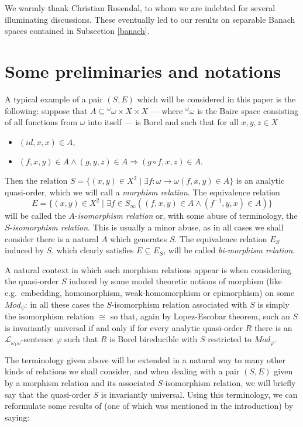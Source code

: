 \documentclass{amsart}
\theoremstyle{definition}
\theoremstyle{remark}
\begin{document}
We warmly thank Christian Rosendal, to whom we are indebted for several illuminating discussions.
These eventually led to our results on separable Banach spaces contained in Subsection \ref{banach}.

\section{Some preliminaries and notations}

A typical example of a pair $(S,E)$ which will be considered in this
paper is the following: suppose that $A
\subseteq {}^\omega \omega \times X \times X$ --- where ${}^\omega
\omega$ is the Baire space consisting of all functions from $\omega$
into itself --- is Borel and such that for all $x,y,z\in X$
\begin{itemize}
\item $(id, x,x) \in A$,
\item $(f,x,y) \in A
\wedge (g,y,z) \in A {\Rightarrow} (g \circ f, x,z) \in A.$
\end{itemize}
 Then the relation $S = \{ (x,y) \in X^2 \mid \exists f \colon \omega
 \to \omega (f,x,y) \in A \}$ is an analytic
quasi-order, which we will call a \emph{morphism relation}.
The equivalence relation
\[ E = \{ (x,y) \in X^2 \mid
\exists f \in S_\infty ((f,x,y) \in A \wedge (f^{-1},y,x) \in A)\} \]
will be called the $A$-\emph{isomorphism relation} or, with some abuse
of terminology, the $S$-\emph{isomorphism relation}.
This is usually a minor abuse, as in all cases we shall consider there
is a natural $A$ which generates $S$.
The equivalence
relation $E_S$ induced by $S$, which
clearly satisfies $E \subseteq E_S$, will be
called \emph{bi-morphism relation}.

A natural context in which such
morphism relations appear is when considering the quasi-order $S$
induced by some
model theoretic
notions of morphism (like e.g.\ embedding, homomorphism,
weak-homomorphism or epimorphism) on
some $Mod_{\psi }$: in all these cases the $S$-isomorphism relation
associated with $S$ is simply the isomorphism relation $\cong$ so
that, again by Lopez-Escobar theorem, such an
$S$ is invariantly universal if and only if for every analytic quasi-order $R$
there is an ${\mathcal{L}}_{\omega_1 \omega}$-sentence ${\varphi}$ such that $R$ is
Borel bireducible with $S$ restricted to $Mod_{\varphi}$.

The terminology given above will be extended in a natural way to many other kinds
of relations we shall consider, and when dealing with a pair $(S,E)$ given by a
morphism relation and its
associated $S$-isomorphism relation, we will briefly say that
the quasi-order $S$
is invariantly universal.
Using this terminology, we can reformulate some results of \cite{FriMot} (one of which was mentioned in the introduction) by
saying:
\end{document}
